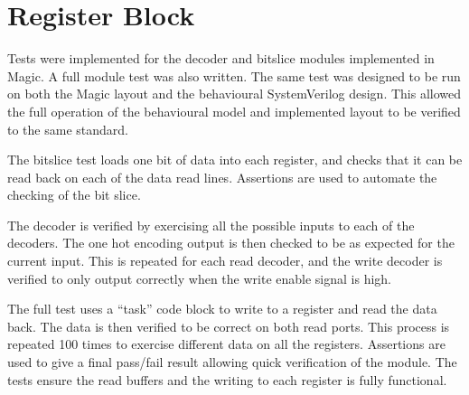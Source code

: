 
\section{Register Block}

Tests were implemented for the decoder and bitslice modules implemented in Magic. 
A full module test was also written. 
The same test was designed to be run on both the Magic layout and the behavioural SystemVerilog design. 
This allowed the full operation of the behavioural model and implemented layout to be verified to the same standard. 

The bitslice test loads one bit of data into each register, and checks that it can be read back on each of the data read lines.
Assertions are used to automate the checking of the bit slice.

The decoder is verified by exercising all the possible inputs to each of the decoders.
The one hot encoding output is then checked to be as expected for the current input. %
This is repeated for each read decoder, and the write decoder is verified to only output correctly when the write enable signal is high. 

The full test uses a ``task'' code block to write to a register and read the data back.
The data is then verified to be correct on both read ports.
This process is repeated 100 times to exercise different data on all the registers. 
Assertions are used to give a final pass/fail result allowing quick verification of the module.
The tests ensure the read buffers and the writing to each register is fully functional.




